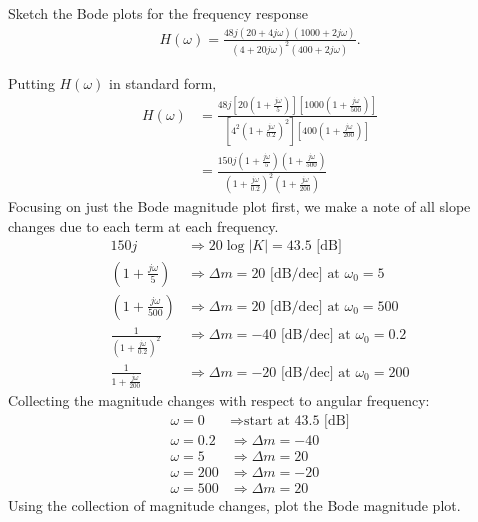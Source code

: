 \documentclass{report}
\begin{document}
\begin{example}
    Sketch the Bode plots for the frequency response
    \begin{align*}
        H(\omega) = \frac{48j(20+4j\omega)(1000+2j\omega)}{(4+20j\omega)^2(400+2j\omega)}.
    \end{align*}
\end{example}
\begin{solution}
    Putting $H(\omega)$ in standard form, 
    \begin{align*}
        H(\omega) &= \frac{48j\left[20\left(1+\frac{j\omega}{5}\right)\right]\left[1000\left(1+\frac{j\omega}{500}\right)\right]}{\left[4^2\left(1+\frac{j\omega}{0.2}\right)^2\right]\left[400\left(1+\frac{j\omega}{200}\right)\right]} \\
        &= \frac{150j\left(1+\frac{j\omega}{5}\right)\left(1+\frac{j\omega}{500}\right)}{\left(1+\frac{j\omega}{0.2}\right)^2\left(1+\frac{j\omega}{200}\right)}
    \end{align*}
    Focusing on just the Bode magnitude plot first, we make a note of all slope changes due to each term at each frequency.
    \begin{align*}
        150j &\Longrightarrow 20\log|K| = 43.5 \text{ [dB] } \\
        \left(1+\frac{j\omega}{5}\right) &\Longrightarrow \Delta m = 20 \text{ [dB/dec] at } \omega_0 = 5 \\
        \left(1+\frac{j\omega}{500}\right) &\Longrightarrow \Delta m = 20 \text{ [dB/dec] at } \omega_0 = 500 \\
        \frac{1}{\left(1+\frac{j\omega}{0.2}\right)^2} &\Longrightarrow \Delta m = -40 \text{ [dB/dec] at } \omega_0 = 0.2 \\
        \frac{1}{1+\frac{j\omega}{200}} &\Longrightarrow \Delta m = -20 \text{ [dB/dec] at } \omega_0 = 200
    \end{align*}
    Collecting the magnitude changes with respect to angular frequency:
    \begin{align*}
        \omega = 0 &\Longrightarrow \text{start at 43.5 [dB]} \\ 
        \omega = 0.2 &\Longrightarrow \Delta m = -40 \\
        \omega = 5 &\Longrightarrow \Delta m = 20 \\
        \omega = 200 &\Longrightarrow \Delta m = -20 \\
        \omega = 500 &\Longrightarrow \Delta m = 20
    \end{align*}
    Using the collection of magnitude changes, plot the Bode magnitude plot.

\end{solution}
\end{document}
